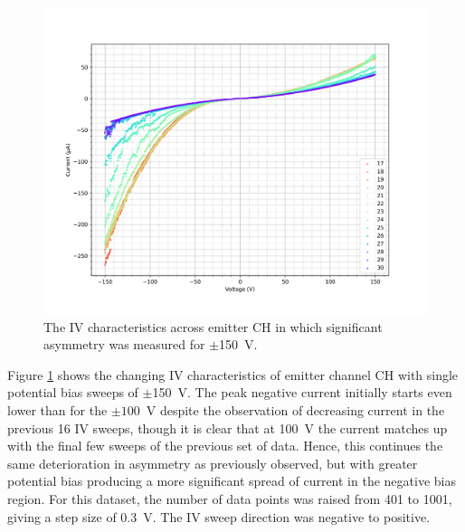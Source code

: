 \begin{refsection}
\begin{figure}[H]
    \centering
    \includegraphics[width=\linewidth]{Chapter7/Figs/Raster/Emitters/146-159_iv.png}
    \caption{The IV characteristics across emitter CH in which significant asymmetry was measured for $\pm$150~\si{\volt}.}
    \label{fig:e_ch_146-159_iv}
\end{figure}

Figure \ref{fig:e_ch_146-159_iv} shows the changing IV characteristics of emitter channel CH with single potential bias sweeps of $\pm$150~\si{\volt}. The peak negative current initially starts even lower than for the $\pm100$~\si{\volt} despite the observation of decreasing current in the previous 16 IV sweeps, though it is clear that at 100~\si{\volt} the current matches up with the final few sweeps of the previous set of data. Hence, this continues the same deterioration in asymmetry as previously observed, but with greater potential bias producing a more significant spread of current in the negative bias region. For this dataset, the number of data points was raised from 401 to 1001, giving a step size of 0.3~\si{\volt}. The IV sweep direction was negative to positive.


\end{refsection}
